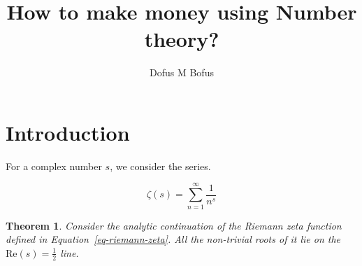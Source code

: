\documentclass{article}
\title{How to make money using Number theory?}
\author{Dofus M Bofus}
\newtheorem{theorem}{Theorem}[section]
\begin{document}
\maketitle

\section{Introduction}

For a complex number $s$, we consider the series.

\begin{equation}
  \zeta(s) = \sum_{n=1}^\infty \frac{1}{n^s}
  \label{eq-riemann-zeta}
\end{equation}

\begin{theorem}
  Consider the analytic continuation of the \emph{Riemann zeta function}
  defined in Equation~\ref{eq-riemann-zeta}. All the non-trivial roots
  of it lie on the $\mathrm{Re}(s)=\frac{1}{2}$ line.
\end{theorem}
\end{document}
